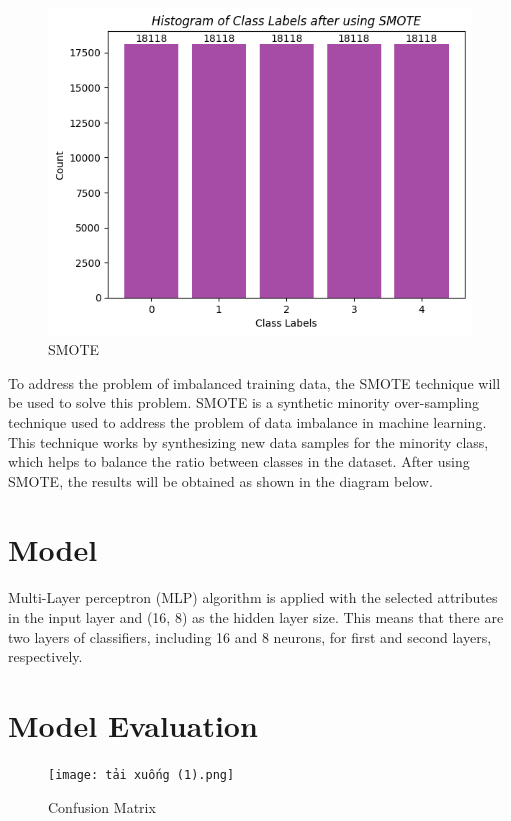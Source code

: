 \documentclass{article}
\begin{document}
\begin{figure}[h]
\centering
\includegraphics[scale=0.6]{SMOTE.png} %
\caption{SMOTE}
\label{fig:SMOTE} %
\end{figure}
To address the problem of imbalanced training data, the SMOTE technique will be used to solve this problem. SMOTE is a synthetic minority over-sampling technique used to address the problem of data imbalance in machine learning. This technique works by synthesizing new data samples for the minority class, which helps to balance the ratio between classes in the dataset. After using SMOTE, the results will be obtained as shown in the diagram below.
\section {Model}
Multi-Layer perceptron (MLP) algorithm is applied with the selected attributes in the input layer and (16, 8) as the hidden layer size. This means that there are two layers of classifiers, including 16 and 8 neurons, for first and second layers, respectively.
\section {Model Evaluation}
\begin{figure}[htp]
\centering
\texttt{[image: tải xuống (1).png]} %
\caption{Confusion Matrix}
\label{fig:confusion_matrix} %
\end{figure}
\end{document}
